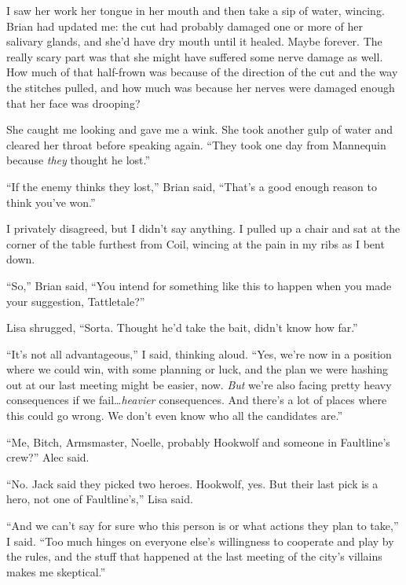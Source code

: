 I saw her work her tongue in her mouth and then take a sip of water, wincing.  Brian had updated me: the cut had probably damaged one or more of her salivary glands, and she'd have dry mouth until it healed.  Maybe forever.  The really scary part was that she might have suffered some nerve damage as well.  How much of that half-frown was because of the direction of the cut and the way the stitches pulled, and how much was because her nerves were damaged enough that her face was drooping?



She caught me looking and gave me a wink.  She took another gulp of water and cleared her throat before speaking again.  ``They took one day from Mannequin because \emph{they }thought he lost.''



``If the enemy thinks they lost,'' Brian said, ``That's a good enough reason to think you've won.''



I privately disagreed, but I didn't say anything.  I pulled up a chair and sat at the corner of the table furthest from Coil, wincing at the pain in my ribs as I bent down.



``So,'' Brian said, ``You intend for something like this to happen when you made your suggestion, Tattletale?''



Lisa shrugged, ``Sorta.  Thought he'd take the bait, didn't know how far.''



``It's not all advantageous,'' I said, thinking aloud.  ``Yes, we're now in a position where we could win, with some planning or luck, and the plan we were hashing out at our last meeting might be easier, now.  \emph{But} we're also facing pretty heavy consequences if we fail\ldots \emph{heavier} consequences.  And there's a lot of places where this could go wrong.  We don't even know who all the candidates are.''



``Me, Bitch, Armsmaster, Noelle, probably Hookwolf and someone in Faultline's crew?''  Alec said.



``No.  Jack said they picked two heroes.  Hookwolf, yes.  But their last pick is a hero, not one of Faultline's,'' Lisa said.



``And we can't say for sure who this person is or what actions they plan to take,'' I said.  ``Too much hinges on everyone else's willingness to cooperate and play by the rules, and the stuff that happened at the last meeting of the city's villains makes me skeptical.''



